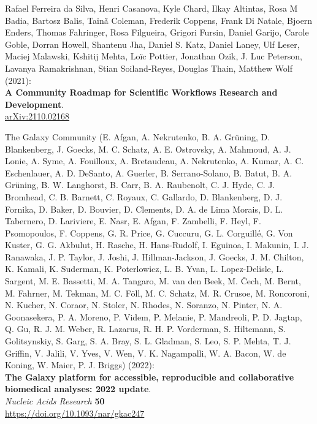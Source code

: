 \begin{thebibliography}{9}
Rafael Ferreira da Silva, Henri Casanova, Kyle Chard, Ilkay
Altintas, Rosa M Badia, Bartosz Balis, Tainã Coleman, Frederik Coppens,
Frank Di Natale, Bjoern Enders, Thomas Fahringer, Rosa Filgueira,
Grigori Fursin, Daniel Garijo, Carole Goble, Dorran Howell, Shantenu
Jha, Daniel S. Katz, Daniel Laney, Ulf Leser, Maciej Malawski, Kshitij
Mehta, Loïc Pottier, Jonathan Ozik, J. Luc Peterson, Lavanya
Ramakrishnan, Stian Soiland-Reyes, Douglas Thain, Matthew Wolf (2021):\\
\textbf{A Community Roadmap for Scientific Workflows Research and
Development}.\\
\href{https://arxiv.org/abs/2110.02168}{arXiv:2110.02168} 

The Galaxy Community (E. Afgan, A. Nekrutenko, B. A.
Grüning, D. Blankenberg, J. Goecks, M. C. Schatz, A. E. Ostrovsky, A.
Mahmoud, A. J. Lonie, A. Syme, A. Fouilloux, A. Bretaudeau, A.
Nekrutenko, A. Kumar, A. C. Eschenlauer, A. D. DeSanto, A. Guerler, B.
Serrano-Solano, B. Batut, B. A. Grüning, B. W. Langhorst, B. Carr, B. A.
Raubenolt, C. J. Hyde, C. J. Bromhead, C. B. Barnett, C. Royaux, C.
Gallardo, D. Blankenberg, D. J. Fornika, D. Baker, D. Bouvier, D.
Clements, D. A. de Lima Morais, D. L. Tabernero, D. Lariviere, E. Nasr,
E. Afgan, F. Zambelli, F. Heyl, F. Psomopoulos, F. Coppens, G. R. Price,
G. Cuccuru, G. L. Corguillé, G. Von Kuster, G. G. Akbulut, H. Rasche, H.
Hans-Rudolf, I. Eguinoa, I. Makunin, I. J. Ranawaka, J. P. Taylor, J.
Joshi, J. Hillman-Jackson, J. Goecks, J. M. Chilton, K. Kamali, K.
Suderman, K. Poterlowicz, L. B. Yvan, L. Lopez-Delisle, L. Sargent, M.
E. Bassetti, M. A. Tangaro, M. van den Beek, M. Čech, M. Bernt, M.
Fahrner, M. Tekman, M. C. Föll, M. C. Schatz, M. R. Crusoe, M.
Roncoroni, N. Kucher, N. Coraor, N. Stoler, N. Rhodes, N. Soranzo, N.
Pinter, N. A. Goonasekera, P. A. Moreno, P. Videm, P. Melanie, P.
Mandreoli, P. D. Jagtap, Q. Gu, R. J. M. Weber, R. Lazarus, R. H. P.
Vorderman, S. Hiltemann, S. Golitsynskiy, S. Garg, S. A. Bray, S. L.
Gladman, S. Leo, S. P. Mehta, T. J. Griffin, V. Jalili, V. Yves, V. Wen,
V. K. Nagampalli, W. A. Bacon, W. de Koning, W. Maier, P. J. Briggs)
(2022):\\
\textbf{The Galaxy platform for accessible, reproducible and
collaborative biomedical analyses: 2022 update}.\\
\emph{Nucleic Acids Research} \textbf{50}\\
\url{https://doi.org/10.1093/nar/gkac247}


\end{thebibliography}

